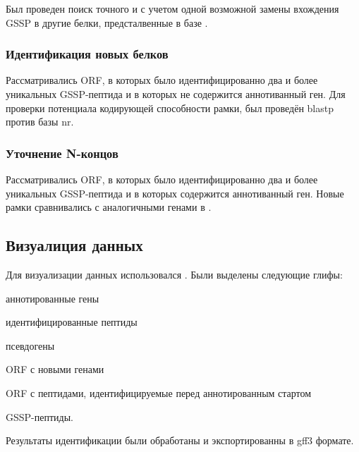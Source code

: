 Был проведен поиск точного и с учетом одной возможной замены вхождения GSSP в другие белки, предсталвенные в базе .  


\subsubsection{Идентификация новых белков}
Рассматривались ORF, в которых было идентифицированно два и более уникальных GSSP-пептида и в которых не содержится аннотиванный ген. Для проверки потенциала кодирующей способности рамки, был проведён blastp против базы nr. 

\subsubsection{Уточнение N-концов}
Рассматривались ORF, в которых было идентифицированно два и более уникальных GSSP-пептида и в которых содержится аннотиванный ген. Новые рамки сравнивались с аналогичными генами в .


\subsection{Визуалиция данных}
Для визуализации данных использовался . Были выделены следующие глифы: 
\begin{inparaenum}
    \item аннотированные гены
    \item идентифицированные пептиды
    \item псевдогены
    \item ORF с новыми генами
    \item ORF с пептидами, идентифицируемые перед аннотированным стартом
    \item GSSP-пептиды.
\end{inparaenum} Результаты идентификации были обработаны и экспортированны в gff3 формате.


